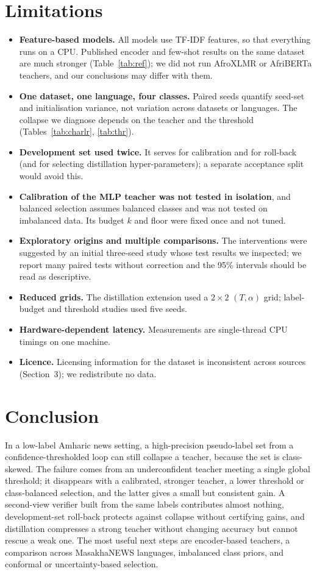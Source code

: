 \section{Limitations}
\begin{itemize}
\item \textbf{Feature-based models.} All models use TF-IDF features, so that everything runs on a CPU. Published encoder and few-shot results on the same dataset are much stronger (Table~\ref{tab:ref}); we did not run AfroXLMR or AfriBERTa teachers, and our conclusions may differ with them.
\item \textbf{One dataset, one language, four classes.} Paired seeds quantify seed-set and initialisation variance, not variation across datasets or languages. The collapse we diagnose depends on the teacher and the threshold (Tables~\ref{tab:charlr}, \ref{tab:thr}).
\item \textbf{Development set used twice.} It serves for calibration and for roll-back (and for selecting distillation hyper-parameters); a separate acceptance split would avoid this.
\item \textbf{Calibration of the MLP teacher was not tested in isolation}, and balanced selection assumes balanced classes and was not tested on imbalanced data. Its budget $k$ and floor were fixed once and not tuned.
\item \textbf{Exploratory origins and multiple comparisons.} The interventions were suggested by an initial three-seed study whose test results we inspected; we report many paired tests without correction and the 95\% intervals should be read as descriptive.
\item \textbf{Reduced grids.} The distillation extension used a $2\times2$ $(T,\alpha)$ grid; label-budget and threshold studies used five seeds.
\item \textbf{Hardware-dependent latency.} Measurements are single-thread CPU timings on one machine.
\item \textbf{Licence.} Licensing information for the dataset is inconsistent across sources (Section~3); we redistribute no data.
\end{itemize}

\section{Conclusion}
In a low-label Amharic news setting, a high-precision pseudo-label set from a confidence-thresholded loop can still collapse a teacher, because the set is class-skewed. The failure comes from an underconfident teacher meeting a single global threshold; it disappears with a calibrated, stronger teacher, a lower threshold or class-balanced selection, and the latter gives a small but consistent gain. A second-view verifier built from the same labels contributes almost nothing, development-set roll-back protects against collapse without certifying gains, and distillation compresses a strong teacher without changing accuracy but cannot rescue a weak one. The most useful next steps are encoder-based teachers, a comparison across MasakhaNEWS languages, imbalanced class priors, and conformal or uncertainty-based selection.

